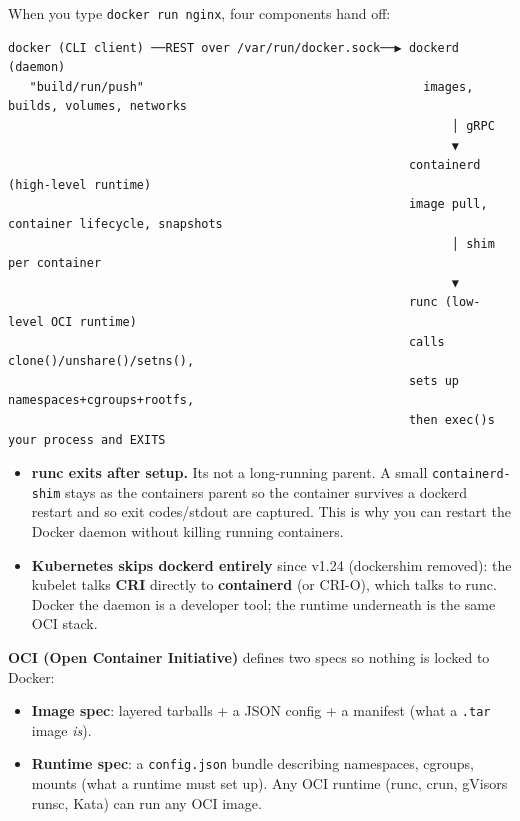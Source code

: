 \documentclass[11pt]{article}
\providecommand{\tightlist}{\setlength{\itemsep}{1pt}\setlength{\parskip}{0pt}}
\begin{document}
When you type \texttt{docker\ run\ nginx}, four components hand off:

\setcodelang{}

\begin{verbatim}
docker (CLI client) ──REST over /var/run/docker.sock──▶ dockerd (daemon)
   "build/run/push"                                       images, builds, volumes, networks
                                                              │ gRPC
                                                              ▼
                                                        containerd (high-level runtime)
                                                        image pull, container lifecycle, snapshots
                                                              │ shim per container
                                                              ▼
                                                        runc (low-level OCI runtime)
                                                        calls clone()/unshare()/setns(),
                                                        sets up namespaces+cgroups+rootfs,
                                                        then exec()s your process and EXITS
\end{verbatim}

\begin{itemize}
\tightlist
\item
  \textbf{runc exits after setup.} It\textquotesingle s not a long-running parent. A small \texttt{containerd-shim} stays as the container\textquotesingle s parent so the container survives a dockerd restart and so exit codes/stdout are captured. This is why you can restart the Docker daemon without killing running containers.
\item
  \textbf{Kubernetes skips dockerd entirely} since v1.24 (dockershim removed): the kubelet talks \textbf{CRI} directly to \textbf{containerd} (or CRI-O), which talks to runc. Docker the daemon is a developer tool; the runtime underneath is the same OCI stack.
\end{itemize}

\textbf{OCI (Open Container Initiative)} defines two specs so nothing is locked to Docker:

\begin{itemize}
\tightlist
\item
  \textbf{Image spec}: layered tarballs + a JSON config + a manifest (what a \texttt{.tar} image \emph{is}).
\item
  \textbf{Runtime spec}: a \texttt{config.json} bundle describing namespaces, cgroups, mounts (what a runtime must set up). Any OCI runtime (runc, crun, gVisor\textquotesingle s runsc, Kata) can run any OCI image.
\end{itemize}
\end{document}
